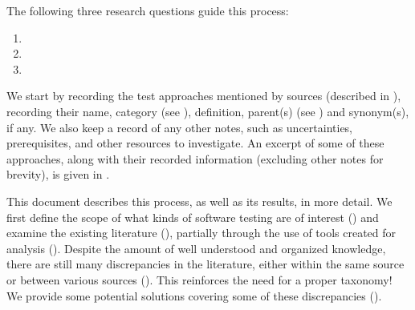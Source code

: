 \ifnotpaper
    The following three research questions guide this process:
    \begin{enumerate}
        \item \rqatext{}
        \item \rqbtext{}
        \item \rqctext{}
    \end{enumerate}
    We start by recording the \approachCount{} test approaches mentioned by
    \srcCount{} sources (described in ), recording their name,
    category (see ), definition, parent(s)
    (see ) and synonym(s), if any. We also keep a
    record of any other notes, such as uncertainties, prerequisites, and other
    resources to investigate. An excerpt of some of these approaches, along
    with their recorded information (excluding other notes for brevity), is
    given in .
\fi

This document describes this process, as well as its results, in more detail.
We first define the scope of
what kinds of software testing are of interest () and examine the
existing literature ()\ifnotpaper, partially through the use
of tools created for analysis ()\fi. Despite the amount of well
understood and organized knowledge, there are still many discrepancies in the
literature, either within the same source or between various
sources (). This reinforces the need for a proper taxonomy! We
provide some potential solutions covering some of these discrepancies
().

\ifnotpaper
    \begin{bigLandscape}
        
    \end{bigLandscape}
\fi